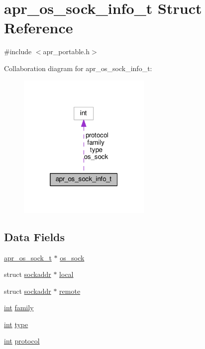 \hypertarget{structapr__os__sock__info__t}{}\section{apr\+\_\+os\+\_\+sock\+\_\+info\+\_\+t Struct Reference}
\label{structapr__os__sock__info__t}


{\ttfamily \#include $<$apr\+\_\+portable.\+h$>$}



Collaboration diagram for apr\+\_\+os\+\_\+sock\+\_\+info\+\_\+t\+:
\nopagebreak
\begin{figure}[H]
\begin{center}
\leavevmode
\includegraphics[width=181pt]{structapr__os__sock__info__t__coll__graph}
\end{center}
\end{figure}
\subsection*{Data Fields}
\begin{DoxyCompactItemize}
\item 
\hyperlink{group__apr__portabile_ga2965cd2e48cb6513bc0ba05aa6083ed7}{apr\+\_\+os\+\_\+sock\+\_\+t} $\ast$ \hyperlink{structapr__os__sock__info__t_a952464d2f91ca4650e8b4848a81745b5}{os\+\_\+sock}
\item 
struct \hyperlink{group__apr__network__io_ga0b610ae0cdca368eefee514a7b12f632}{sockaddr} $\ast$ \hyperlink{structapr__os__sock__info__t_afaf470560cbc3088479af708878aa086}{local}
\item 
struct \hyperlink{group__apr__network__io_ga0b610ae0cdca368eefee514a7b12f632}{sockaddr} $\ast$ \hyperlink{structapr__os__sock__info__t_ae71fe14a5eb9141fc4ad0a6d0a91f17e}{remote}
\item 
\hyperlink{pcre_8txt_a42dfa4ff673c82d8efe7144098fbc198}{int} \hyperlink{structapr__os__sock__info__t_aa29fd0cf57b0b5e3559961f068fa8b7e}{family}
\item 
\hyperlink{pcre_8txt_a42dfa4ff673c82d8efe7144098fbc198}{int} \hyperlink{structapr__os__sock__info__t_a248fb394cd644b31619f44de0936aa04}{type}
\item 
\hyperlink{pcre_8txt_a42dfa4ff673c82d8efe7144098fbc198}{int} \hyperlink{structapr__os__sock__info__t_a176ede3ecf40abf0f82a01bfeb95f1e3}{protocol}
\end{DoxyCompactItemize}


